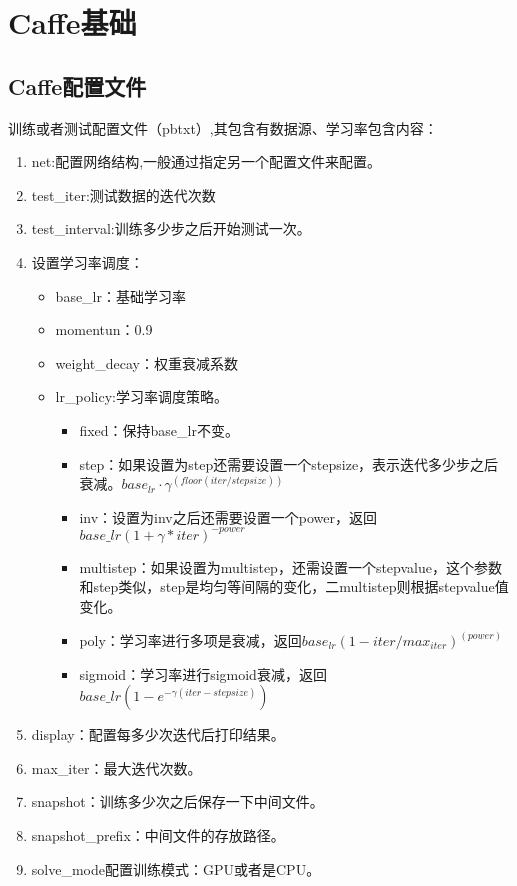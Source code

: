 \chapter{Caffe基础}
\section{Caffe配置文件}
训练或者测试配置文件（pbtxt）,其包含有数据源、学习率包含内容：
\begin{enumerate}
  \item net:配置网络结构,一般通过指定另一个配置文件来配置。
  \item test\_iter:测试数据的迭代次数
  \item test\_interval:训练多少步之后开始测试一次。
  \item 设置学习率调度：
	  \begin{itemize}
		  \item base\_lr：基础学习率
		  \item momentun：0.9
		  \item weight\_decay：权重衰减系数
		  \item lr\_policy:学习率调度策略。
			  \begin{itemize}
				  \item fixed：保持base\_lr不变。
				  \item step：如果设置为step还需要设置一个stepsize，表示迭代多少步之后衰减。$base_{lr}\cdot\gamma^{(floor(iter/stepsize))}$
				  \item inv：设置为inv之后还需要设置一个power，返回$base\_lr(1+\gamma*iter)^{-power}$
				  \item multistep：如果设置为multistep，还需设置一个stepvalue，这个参数和step类似，step是均匀等间隔的变化，二multistep则根据stepvalue值变化。
				  \item poly：学习率进行多项是衰减，返回$base_{lr}(1-iter/max_{iter})^(power)$
				  \item sigmoid：学习率进行sigmoid衰减，返回$base\_{lr}(1-e^{-\gamma(iter-stepsize)})$
			  \end{itemize}
	  \end{itemize}
  \item display：配置每多少次迭代后打印结果。
  \item max\_iter：最大迭代次数。
  \item snapshot：训练多少次之后保存一下中间文件。
  \item snapshot\_prefix：中间文件的存放路径。
  \item solve\_mode配置训练模式：GPU或者是CPU。
\end{enumerate}
